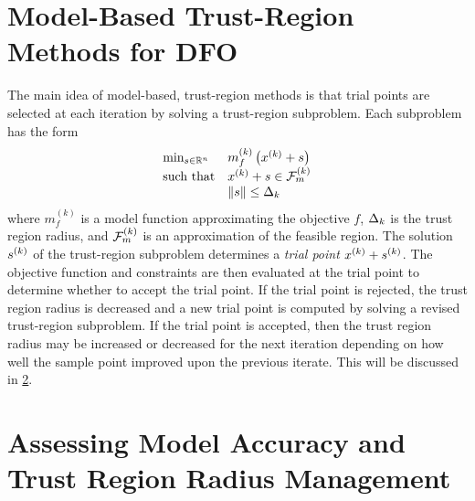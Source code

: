 






\pagebreak
\section{Model-Based Trust-Region Methods for DFO}

The main idea of model-based, trust-region methods is that trial points are selected at each iteration by solving a trust-region subproblem.  
Each subproblem has the form 
\[ \begin{array}{ll} \min_{s \in \mathbb R^n} & m_f^{(k)}\left(x^{(k)} + s\right) \\ 
\textrm{such that} & x^{(k)}+s \in {\mathcal F_m^{(k)}} \\
& {\left\|s\right\|} \le \Delta_k
\end{array} \]
where $m_f^{(k)}$ is a model function approximating the objective $f$, $\Delta_k$ is the trust region radius,
and ${\mathcal F_m^{(k)}}$ is an approximation of the feasible region.
The solution ${{s}^{(k)}}$ of the trust-region subproblem determines a {\em trial point} $x^{(k)} + {{s}^{(k)}}$.  
The objective function and constraints are then evaluated at the trial point to determine whether to accept the trial point.
If the trial point is rejected, the trust region radius is decreased and a new trial point is computed by solving a revised trust-region subproblem.     
If the trial point is accepted, then the trust region radius may be increased or decreased for the next iteration 
depending on how well the sample point improved upon the previous iterate.
This will be discussed in \cref{rhosection}.


\section{Assessing Model Accuracy and Trust Region Radius Management}

\label{rhosection}

